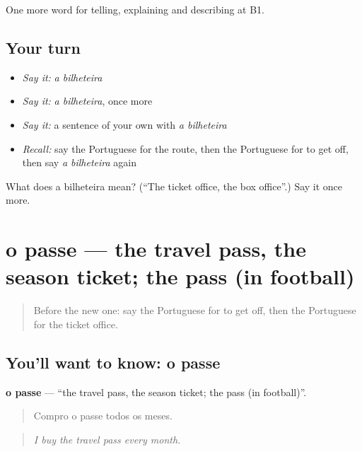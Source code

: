 \begin{grammarlens}[title={What you've built}]
One more word for telling, explaining and describing at B1.
\end{grammarlens}

\subsection*{Your turn}
\begin{itemize}
\raggedright
  \item \emph{Say it:} \emph{a bilheteira}
  \item \emph{Say it:} \emph{a bilheteira}, once more
  \item \emph{Say it:} a sentence of your own with \emph{a bilheteira}
  \item \emph{Recall:} say the Portuguese for the route, then the Portuguese for to get off, then say \emph{a bilheteira} again
\end{itemize}

\begin{tcolorbox}[breakable,colback=teal!4,colframe=teal!35!black,title={Before you move on}]
What does a bilheteira mean? (\textquotedblleft{}The ticket office, the box office\textquotedblright{}.) Say it once more.
\end{tcolorbox}
\section[o passe]{o passe — the travel pass, the season ticket; the pass (in football)}

\label{lesson:PT-C414-passe}



\begin{quote}
Before the new one: say the Portuguese for to get off, then the Portuguese for the ticket office.
\end{quote}

\subsection*{You'll want to know: o passe}
\textbf{o passe} — \textquotedblleft{}the travel pass, the season ticket; the pass (in football)\textquotedblright{}.

\begin{quote}
Compro o passe todos os meses.
\end{quote}

\begin{quote}
\emph{I buy the travel pass every month.}
\end{quote}

